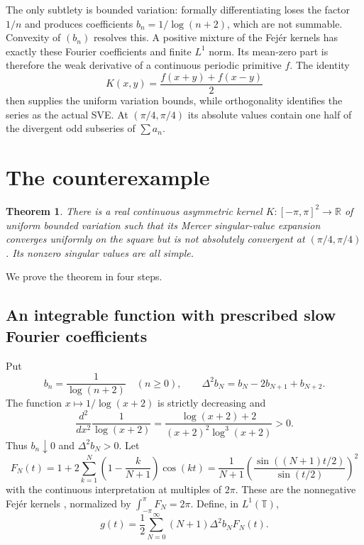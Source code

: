 \documentclass[11pt]{article}
\newtheorem{theorem}{Theorem}
\theoremstyle{remark}
\newcommand{\T}{\mathbb T}
\newcommand{\R}{\mathbb R}
\begin{document}
The only subtlety is bounded variation: formally differentiating loses the
factor $1/n$ and produces coefficients $b_n=1/\log(n+2)$, which are not
summable.  Convexity of $(b_n)$ resolves this.  A positive mixture of the
Fej\'er kernels has exactly these Fourier coefficients and finite $L^1$ norm.
Its mean-zero part is therefore the weak derivative of a continuous periodic
primitive $f$.  The identity
\[
 K(x,y)=\frac{f(x+y)+f(x-y)}2
\]
then supplies the uniform variation bounds, while orthogonality identifies
the series as the actual SVE.  At $(\pi/4,\pi/4)$ its absolute values contain
one half of the divergent odd subseries of $\sum a_n$.

\section{The counterexample}

\begin{theorem}\label{thm:main}
There is a real continuous asymmetric kernel
$K:[-\pi,\pi]^2\to\R$ of uniform bounded variation such that its Mercer
singular-value expansion converges uniformly on the square but is not
absolutely convergent at $(\pi/4,\pi/4)$.  Its nonzero singular values are all
simple.
\end{theorem}

We prove the theorem in four steps.

\subsection{An integrable function with prescribed slow Fourier coefficients}

Put
\[
 b_n=\frac1{\log(n+2)}\quad(n\geq0),
 \qquad
 \Delta^2b_N=b_N-2b_{N+1}+b_{N+2}.
\]
The function $x\mapsto1/\log(x+2)$ is strictly decreasing and
\[
 \frac{d^2}{dx^2}\frac1{\log(x+2)}
 =\frac{\log(x+2)+2}{(x+2)^2\log^3(x+2)}>0.
\]
Thus $b_n\downarrow0$ and $\Delta^2b_N>0$.  Let
\[
 F_N(t)=1+2\sum_{k=1}^N\left(1-\frac{k}{N+1}\right)\cos(kt)
 =\frac1{N+1}\left(\frac{\sin((N+1)t/2)}{\sin(t/2)}\right)^2
\]
with the continuous interpretation at multiples of $2\pi$.  These are the
nonnegative Fej\'er kernels \cite{Fejer}, normalized by
$\int_{-\pi}^{\pi}F_N=2\pi$.  Define, in $L^1(\T)$,
\begin{equation}\label{eq:g}
 g(t)=\frac12\sum_{N=0}^{\infty}(N+1)\Delta^2b_N F_N(t).
\end{equation}
\end{document}
